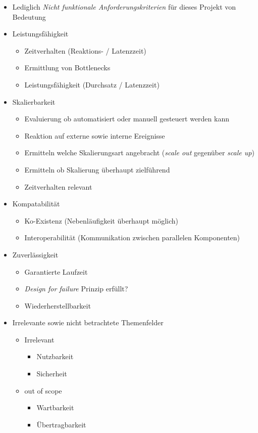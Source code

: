 \begin{itemize}
	\item Lediglich \emph{Nicht funktionale Anforderungskriterien} für dieses Projekt von Bedeutung
	\item Leistungsfähigkeit
	\begin{itemize}
		\item Zeitverhalten (Reaktions- / Latenzzeit)
		\item Ermittlung von Bottlenecks
		\item Leistungsfähigkeit (Durchsatz / Latenzzeit)
	\end{itemize}
	\item Skalierbarkeit
	\begin{itemize}
		\item Evaluierung ob automatisiert oder manuell gesteuert werden kann
		\item Reaktion auf externe sowie interne Ereignisse
		\item Ermitteln welche Skalierungsart angebracht (\emph{scale out} gegenüber \emph{scale up})
		\item Ermitteln ob Skalierung überhaupt zielführend
		\item Zeitverhalten relevant
	\end{itemize}
	\item Kompatabilität
	\begin{itemize}
		\item Ko-Existenz (Nebenläufigkeit überhaupt möglich)
		\item Interoperabilität (Kommunikation zwischen parallelen Komponenten)
	\end{itemize}
	\item Zuverlässigkeit
	\begin{itemize}
		\item Garantierte Laufzeit
		\item \emph{Design for failure} Prinzip erfüllt?
		\item Wiederherstellbarkeit
	\end{itemize}
	\item Irrelevante sowie nicht betrachtete Themenfelder
	\begin{itemize}
		\item Irrelevant
		\begin{itemize}
			\item Nutzbarkeit
			\item Sicherheit
		\end{itemize}
		\item out of scope
		\begin{itemize}
			\item Wartbarkeit
			\item Übertragbarkeit
		\end{itemize}
	\end{itemize}
\end{itemize}
